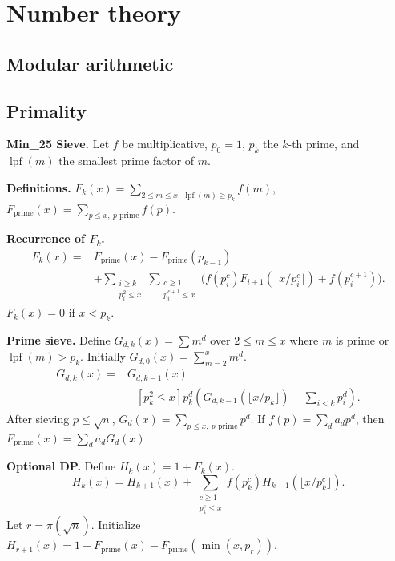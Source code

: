 \chapter{Number theory}

\section{Modular arithmetic}

\section{Primality}

	\textbf{Min\_25 Sieve.}
	Let $f$ be multiplicative, $p_0=1$, $p_k$ the $k$-th prime,
	and $\operatorname{lpf}(m)$ the smallest prime factor of $m$.

	\textbf{Definitions.}
	$F_k(x)=\sum_{2\le m\le x,\ \operatorname{lpf}(m)\ge p_k}f(m)$,
	$F_{\mathrm{prime}}(x)=\sum_{p\le x,\ p\text{ prime}}f(p)$.

	\textbf{Recurrence of $F_k$.}
	\[
	\begin{aligned}
	F_k(x)={}&F_{\mathrm{prime}}(x)-F_{\mathrm{prime}}(p_{k-1})\\
	&+\sum_{\substack{i\ge k\\p_i^2\le x}}
	\sum_{\substack{c\ge1\\p_i^{c+1}\le x}}
	\bigl(f(p_i^c)F_{i+1}(\lfloor x/p_i^c\rfloor)
	+f(p_i^{c+1})\bigr).
	\end{aligned}
	\]
	$F_k(x)=0$ if $x<p_k$.

	\textbf{Prime sieve.}
	Define $G_{d,k}(x)=\sum m^d$ over $2\le m\le x$ where
	$m$ is prime or $\operatorname{lpf}(m)>p_k$.
	Initially $G_{d,0}(x)=\sum_{m=2}^x m^d$.
	\[
	\begin{aligned}
	G_{d,k}(x)={}&G_{d,k-1}(x)\\
	&-[p_k^2\le x]p_k^d
	\left(G_{d,k-1}(\lfloor x/p_k\rfloor)
	-\sum_{i<k}p_i^d\right).
	\end{aligned}
	\]
	After sieving $p\le\sqrt n$,
	$G_d(x)=\sum_{p\le x,\ p\text{ prime}}p^d$.
	If $f(p)=\sum_d a_dp^d$, then
	$F_{\mathrm{prime}}(x)=\sum_d a_dG_d(x)$.

	\textbf{Optional DP.}
	Define $H_k(x)=1+F_k(x)$.
	\[
	H_k(x)=H_{k+1}(x)+
	\sum_{\substack{c\ge1\\p_k^c\le x}}
	f(p_k^c)H_{k+1}(\lfloor x/p_k^c\rfloor).
	\]
	Let $r=\pi(\sqrt n)$.
	Initialize $H_{r+1}(x)=1+F_{\mathrm{prime}}(x)
	-F_{\mathrm{prime}}(\min(x,p_r))$.

